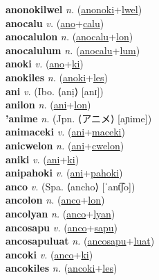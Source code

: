 \textbf{anonokilwel} \textit{n.} (\hyperref[anonoki]{anonoki}+\hyperref[lwel]{lwel})
 \label{anonokilwel} \\
\textbf{anocalu} \textit{v.} (\hyperref[ano]{ano}+\hyperref[calu]{calu})
 \label{anocalu} \\
\textbf{anocalulon} \textit{n.} (\hyperref[anocalu]{anocalu}+\hyperref[lon]{lon})
 \label{anocalulon} \\
\textbf{anocalulum} \textit{n.} (\hyperref[anocalu]{anocalu}+\hyperref[lum]{lum})
 \label{anocalulum} \\
\textbf{anoki} \textit{v.} (\hyperref[ano]{ano}+\hyperref[ki]{ki})
 \label{anoki} \\
\textbf{anokiles} \textit{n.} (\hyperref[anoki]{anoki}+\hyperref[les]{les})
 \label{anokiles} \\
\textbf{ani} \textit{v.} (Ibo. ⟨anị⟩ [anɪ])
 \label{ani} \\
\textbf{anilon} \textit{n.} (\hyperref[ani]{ani}+\hyperref[lon]{lon})
 \label{anilon} \\
\textbf{'anime} \textit{n.} (Jpn. ⟨アニメ⟩ [aɲime])
 \label{'anime} \\
\textbf{animaceki} \textit{v.} (\hyperref[ani]{ani}+\hyperref[maceki]{maceki})
 \label{animaceki} \\
\textbf{anicwelon} \textit{n.} (\hyperref[ani]{ani}+\hyperref[cwelon]{cwelon})
 \label{anicwelon} \\
\textbf{aniki} \textit{v.} (\hyperref[ani]{ani}+\hyperref[ki]{ki})
 \label{aniki} \\
\textbf{anipahoki} \textit{v.} (\hyperref[ani]{ani}+\hyperref[pahoki]{pahoki})
 \label{anipahoki} \\
\textbf{anco} \textit{v.} (Spa. ⟨ancho⟩ [ˈant͡ʃo])
 \label{anco} \\
\textbf{ancolon} \textit{n.} (\hyperref[anco]{anco}+\hyperref[lon]{lon})
 \label{ancolon} \\
\textbf{ancolyan} \textit{n.} (\hyperref[anco]{anco}+\hyperref[lyan]{lyan})
 \label{ancolyan} \\
\textbf{ancosapu} \textit{v.} (\hyperref[anco]{anco}+\hyperref[sapu]{sapu})
 \label{ancosapu} \\
\textbf{ancosapuluat} \textit{n.} (\hyperref[ancosapu]{ancosapu}+\hyperref[luat]{luat})
 \label{ancosapuluat} \\
\textbf{ancoki} \textit{v.} (\hyperref[anco]{anco}+\hyperref[ki]{ki})
 \label{ancoki} \\
\textbf{ancokiles} \textit{n.} (\hyperref[ancoki]{ancoki}+\hyperref[les]{les})
 \label{ancokiles} \\
